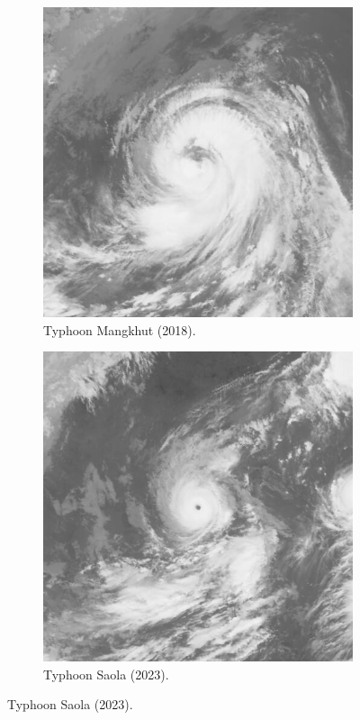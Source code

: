 \begin{figure}[hb!]
\begin{subfigure}[b]{0.45\textwidth}
\end{subfigure}
\begin{subfigure}[b]{0.45\textwidth}
\centering
\includegraphics[width=0.8\linewidth]{graphics/HMW818091603.201822.jpg}
\caption{Typhoon Mangkhut (2018).}
\end{subfigure}
\begin{subfigure}[b]{0.45\textwidth}
\centering
\includegraphics[width=0.8\linewidth]{graphics/HMW923090103.202309.jpg}
\caption{Typhoon Saola (2023).}
\end{subfigure}
\end{figure}

